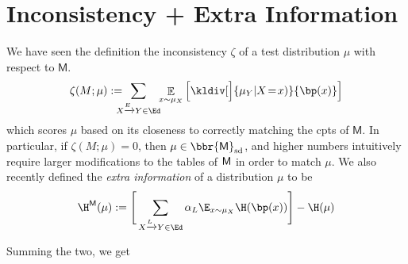 \documentclass{article}
\newcommand{\sfM}{\mathsf M}
\newcommand\SD{_{\text{sd}}}
\begin{document}
	\section{Inconsistency + Extra Information}

		We have seen the definition the inconsistency $\zeta$ of a test distribution $\mu$ with respect to $\sfM$.
		\[
			\zeta(M ; \mu) := %
			\!\!\!\!\!\sum_{ X \xrightarrow{\!\!E} Y  \in \Ed }\!\! \mathop{\mathbb E}_{x \sim \mu_X} \left[\kldiv[\Big]{ \mu_Y | X \!=\! x) }{\bp(x) } \right]
		\]
		which scores $\mu$ based on its closeness to correctly matching the cpts of $\sfM$. In particular, if $\zeta(M;\mu) = 0$, then $\mu \in \bbr{\sfM}\SD$, and higher numbers intuitively require larger modifications to the tables of $\sf M$ in order to match $\mu$.
		We also recently defined the \emph{extra information} of a distribution $\mu$ to be
		\[ \H^{\sfM}(\mu) := \Bigg[\sum_{ X \xrightarrow{\!\!L} Y  \in \Ed } \alpha_L \E_{x \sim \mu_X}  \H (\bp (x)) \Bigg] - \H(\mu) \]

		Summing the two, we get
\end{document}
